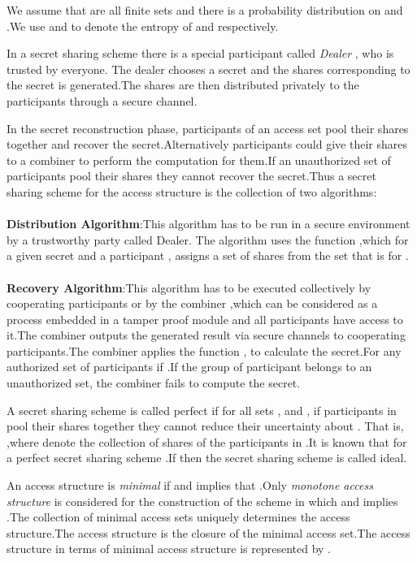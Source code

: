 \documentclass{llncs}
\begin{document}
We assume that  are all finite sets and there is a probability distribution on  and .We use  and  to denote the entropy of  and  respectively.

In a secret sharing scheme there is a special participant called \textit{Dealer} , who is trusted by everyone. The dealer chooses a secret  and the shares  corresponding to the secret is generated.The shares are then distributed privately to the participants through a secure channel.

In the secret reconstruction phase, participants of an access set pool their shares together and recover the secret.Alternatively participants could give their shares to a combiner to perform the computation for them.If an unauthorized set of participants pool their shares they cannot recover the secret.Thus a secret sharing scheme for the access structure  is the collection of two algorithms:\\ \\
\textbf{Distribution Algorithm}:This algorithm has to be run in a secure environment by a trustworthy party called Dealer. The algorithm uses the function  ,which for a given secret  and a participant , assigns a set of shares from the set  that is  for .\\ \\
\textbf{Recovery Algorithm}:This algorithm has to be executed collectively by cooperating participants or by the combiner ,which can be considered as a process embedded in a tamper proof module and all participants have access to it.The combiner outputs the generated result via secure channels to cooperating participants.The combiner applies the function , to  calculate the secret.For any authorized set of participants  if .If the group of participant belongs to an unauthorized set, the combiner fails to compute the secret.

A secret sharing scheme is called perfect if for all sets ,  and , if participants in  pool their shares together they cannot reduce their uncertainty about . That is, ,where  denote the collection of shares of the participants in .It is known that for a perfect secret sharing scheme .If  then the secret sharing scheme is called ideal.

An access structure  is \textit{minimal} if  and  implies that .Only \textit{monotone access structure} is considered for the construction of the scheme in which  and  implies .The collection of minimal access sets uniquely determines the access structure.The access structure is the closure of the minimal access set.The access structure  in terms of minimal access structure is represented by .
\end{document}
